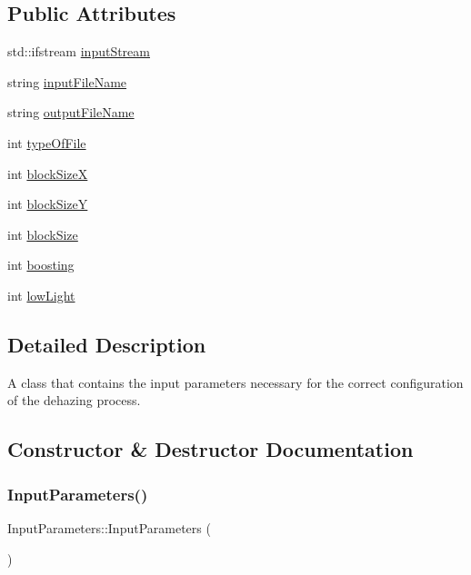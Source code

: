 \subsection*{Public Attributes}
\begin{DoxyCompactItemize}
\item 
std\+::ifstream \mbox{\hyperlink{classInputParameters_a01444453de5dc29f533e1c783b9507ca}{input\+Stream}}
\item 
string \mbox{\hyperlink{classInputParameters_a82ae3ecc2b839b6e39464fb2eb0e2ec0}{input\+File\+Name}}
\item 
string \mbox{\hyperlink{classInputParameters_a8eb77da8296007a113831aa1da195cde}{output\+File\+Name}}
\item 
int \mbox{\hyperlink{classInputParameters_a826c20599ad2c8d4f82f1b84055668dd}{type\+Of\+File}}
\item 
int \mbox{\hyperlink{classInputParameters_a4386973ae0bf43b9040f2bbd0acfcdc0}{block\+SizeX}}
\item 
int \mbox{\hyperlink{classInputParameters_af52112e4d8fbd0e3b137bbb8396222ed}{block\+SizeY}}
\item 
int \mbox{\hyperlink{classInputParameters_a0a4b4c27431edde22c7c53746543f3c3}{block\+Size}}
\item 
int \mbox{\hyperlink{classInputParameters_a3a6b7bb91a4bc6f912a1c7744109dbb1}{boosting}}
\item 
int \mbox{\hyperlink{classInputParameters_a79b3781b35f652c9ffea72703f0f69c4}{low\+Light}}
\end{DoxyCompactItemize}


\subsection{Detailed Description}
A class that contains the input parameters necessary for the correct configuration of the dehazing process. 

\subsection{Constructor \& Destructor Documentation}
\mbox{\label{classInputParameters_a2ede6d73636729561755f9ca986475f8}} 
\subsubsection{\texorpdfstring{Input\+Parameters()}{InputParameters()}}
{\footnotesize\ttfamily Input\+Parameters\+::\+Input\+Parameters (\begin{DoxyParamCaption}{ }\end{DoxyParamCaption})}

